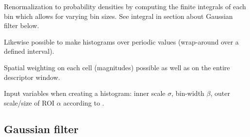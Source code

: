 \documentclass[thesis.tex]{subfiles}
\begin{document}
Renormalization to probability densities by computing the finite integrals of each bin which allows for varying bin sizes. See integral in section about Gaussian filter below.

Likewise possible to make histograms over periodic values (wrap-around over a defined interval).

Spatial weighting on each cell (magnitudes) possible as well as on the entire descriptor window.

Input variables when creating a histogram: inner scale $\sigma$, bin-width $\beta$, outer scale/size of ROI $\alpha$ according to \citet{koenderink1999structure}.


\subsection{Gaussian filter}
\label{sec:histogramsGaussianFilter}
\end{document}
